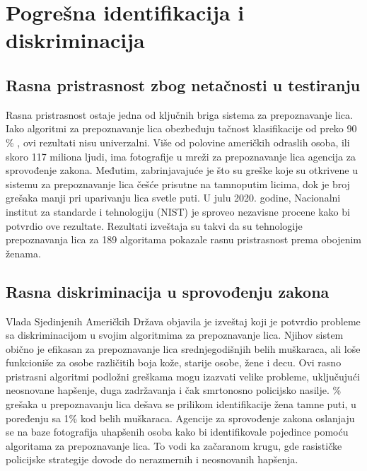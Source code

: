 \documentclass{article}
\begin{document}
\newpage

\section{Pogrešna identifikacija i diskriminacija}

\subsection{Rasna pristrasnost zbog netačnosti u testiranju}

Rasna pristrasnost ostaje jedna od ključnih briga sistema za prepoznavanje lica. Iako algoritmi za prepoznavanje lica obezbeđuju tačnost klasifikacije od preko 90 \% ,  ovi rezultati nisu univerzalni.
\newline
\newline
Više od polovine američkih odraslih osoba, ili skoro 117 miliona ljudi, ima fotografije u mreži za prepoznavanje lica agencija za sprovođenje zakona. Međutim, zabrinjavajuće je što su greške koje su otkrivene u sistemu za prepoznavanje lica češće prisutne na tamnoputim licima, dok je broj grešaka manji pri uparivanju lica svetle puti.
\newline
\newline
U julu 2020. godine, Nacionalni institut za standarde i tehnologiju (NIST) je sproveo nezavisne procene kako bi potvrdio ove rezultate. Rezultati izveštaja su takvi da su tehnologije prepoznavanja lica za 189 algoritama pokazale rasnu pristrasnost prema obojenim ženama. 
\newline
\newline
\subsection{Rasna diskriminacija u sprovođenju zakona}

Vlada Sjedinjenih Američkih Država objavila je izveštaj koji je potvrdio probleme sa diskriminacijom u svojim algoritmima za prepoznavanje lica. Njihov sistem obično je efikasan za prepoznavanje lica srednjegodišnjih belih muškaraca, ali loše funkcioniše za osobe različitih boja kože, starije osobe, žene i decu. Ovi rasno pristrasni algoritmi podložni greškama mogu izazvati velike probleme, uključujući neosnovane hapšenje, duga zadržavanja i čak smrtonosno policijsko nasilje.
\newline
{}\% grešaka u prepoznavanju lica dešava se prilikom identifikacije žena tamne puti, u poređenju sa 1\% kod belih muškaraca.
\newline
\newline
Agencije za sprovođenje zakona oslanjaju se na baze fotografija uhapšenih osoba kako bi identifikovale pojedince pomoću algoritama za prepoznavanje lica. To vodi ka začaranom krugu, gde rasističke policijske strategije dovode do nerazmernih i neosnovanih hapšenja.
\end{document}
